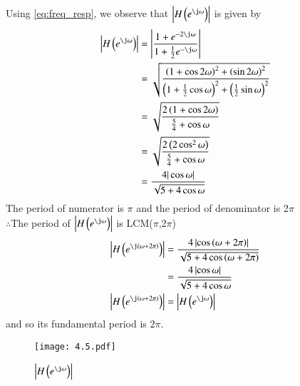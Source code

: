 \documentclass[journal,12pt,twocolumn]{IEEEtran}
\renewcommand\thesection{\arabic{section}}
\begin{document}
\begin{enumerate}[label=\thesection.\arabic*,ref=\thesection.\theenumi]
Using \eqref{eq:freq_resp}, we observe that $\left|H\brak{e^{\j\omega}}\right|$ is given by
\begin{align}
	\left|H\brak{e^{\j\omega}}\right| &= \left|\frac{1 + e^{-2\j\omega}}{1 + \frac{1}{2}e^{-\j\omega}}\right| \\
									  &= \sqrt{\frac{\brak{1 + \cos{2\omega}}^2 + \brak{\sin{2\omega}}^2}{\brak{1 + \frac{1}{2}\cos{\omega}}^2 + \brak{\frac{1}{2}\sin{\omega}}^2}}\\
									  &= \sqrt{\frac{2\brak{1 + \cos{2\omega}}}{\frac{5}{4} + \cos{\omega}}} \\
									  &= \sqrt{\frac{2\brak{2\cos^2{\omega}}}{\frac{5}{4} + \cos{\omega}}} \\
									  &= \frac{4|\cos{\omega}|}{\sqrt{5 + 4\cos{\omega}}}
\end{align}
The period of numerator is $\pi$ and the period of denominator is 2$\pi$\\
$\therefore$The period of $\left|H\brak{e^{\j\omega}}\right|$ is LCM($\pi$,2$\pi$)
\begin{align}
	\left|H\brak{e^{\j\brak{\omega + 2\pi}}}\right| &=\frac{4\abs{\cos\brak{\omega + 2\pi}}}{\sqrt{5+4\cos\brak{\omega +2\pi}}} \\
	&= \frac{4\abs{\cos{\omega}}}{\sqrt{5+4\cos{\omega}}}\\
	\abs{H\brak{e^{\j\brak{\omega+2\pi}}}} &= \abs{H\brak{e^{\j\omega}}}
\end{align}
and so its fundamental period is $2\pi$.
\begin{figure}[!ht]
     \centering
     \texttt{[image: 4.5.pdf]}
     \caption{$\abs{H\brak{e^{\j\omega}}}$}
     \label{fig:dtft}
\end{figure}


\end{enumerate}
\end{document}
